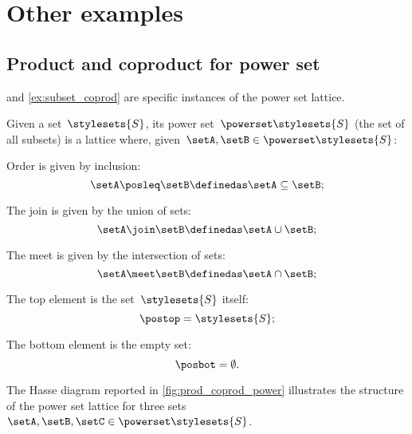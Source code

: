 

\section{Other examples}

\subsection{Product and coproduct for power set}
 and \cref{ex:subset_coprod} are specific instances of the power set lattice.

\begin{definition}
    \label{def:power-set-as-lattice}
    Given a set~$\stylesets{S}$, its power set~$\powerset \stylesets{S}$ (the set of all subsets) is a lattice where, given~$\setA,\setB\in \powerset \stylesets{S}$:
    \begin{compactitem}
        \item Order is given by inclusion:
        \begin{equation*}
            \setA\posleq \setB \definedas \setA\subseteq \setB;
        \end{equation*}
        \item The join is given by the union of sets:
        \begin{equation*}
            \setA\join \setB \definedas \setA\cup \setB;
        \end{equation*}
        \item The meet is given by the intersection of sets:
        \begin{equation*}
            \setA\meet \setB \definedas \setA\cap \setB;
        \end{equation*}
        \item The top element is the set~$\stylesets{S}$ itself:
        \begin{equation*}
            \postop = \stylesets{S};
        \end{equation*}
        \item The bottom element is the empty set:
        \begin{equation*}
            \posbot = \emptyset.
        \end{equation*}
    \end{compactitem}
\end{definition}

The Hasse diagram reported in \cref{fig:prod_coprod_power} illustrates the structure of the power set lattice for three sets~$\setA,\setB,\setC\in \powerset \stylesets{S}$.

